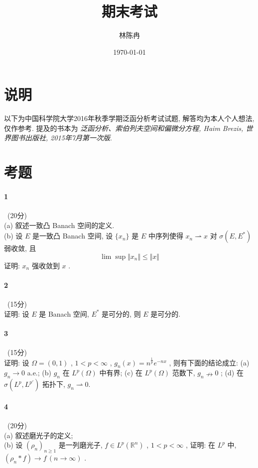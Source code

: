 \documentclass[a4paper, UTF8]{ctexart}				%
\title{期末考试}
\author{林陈冉}
\date{\today}
\numberwithin{equation}{section}				%
\begin{document}
	\maketitle										%
	\section{说明}\label{note}
		以下为中国科学院大学2016年秋季学期泛函分析考试试题, 解答均为本人个人想法, 仅作参考. 提及的书本为 {\it 泛函分析、索伯列夫空间和偏微分方程, Haim Brezis, 世界图书出版社, 2015年7月第一次版}.
	\section{考题}\label{question}
		\paragraph{1} \, (20分)\\
			\indent (a) 叙述一致凸 Banach 空间的定义.\\
			\indent (b) 设 $E$ 是一致凸 Banach 空间, 设 $\{x_n\}$ 是 $E$ 中序列使得 $x_n \rightharpoonup x$ 对 $\sigma(E, E^*)$ 弱收敛, 且 
			\[
				\lim_{ } \sup \Vert{x_n}\Vert \le \Vert{x}\Vert
			\]
			\indent 证明: $x_n$ 强收敛到 $x$ .\\

		\paragraph{2} \, (15分)\\
			\indent 证明: 设 $E$ 是 Banach 空间, $E^*$ 是可分的, 则 $E$ 是可分的.\\
		
		\paragraph{3} \, (15分)\\
			\indent 证明: 设 $\Omega = (0, 1)$ , $1< p < \infty$ , $g_n(x) = n^{\frac{1}{p}}e^{-nx}$ , 则有下面的结论成立: (a) $g_n \rightarrow 0$ a.e.; (b) $g_n$ 在 $L^p(\Omega)$ 中有界; (c) 在 $L^p(\Omega)$ 范数下, $g_n \nrightarrow 0$ ; (d) 在 $\sigma(L^p, L^{p'})$ 拓扑下, $g_n \rightharpoonup 0$.\\

		\paragraph{4} \, (20分)\\
			\indent (a) 叙述磨光子的定义;\\
			\indent (b) 设 $(\rho_n)_{n \ge 1}$ 是一列磨光子, $f \in L^p(\mathbb{R}^n)$ , $1 < p < \infty$ , 证明: 在 $L^p$ 中, $(\rho_n * f) \rightarrow f \, (n \rightarrow \infty)$ .\\
		
\end{document}

